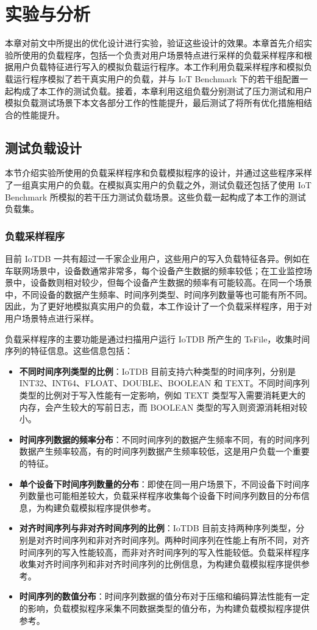 
\chapter{实验与分析\label{sec:chap8}}
本章对前文中所提出的优化设计进行实验，验证这些设计的效果。本章首先介绍实验所使用的负载程序，包括一个负责对用户场景特点进行采样的负载采样程序和根据用户负载特征进行写入的模拟负载运行程序。本工作利用负载采样程序和模拟负载运行程序模拟了若干真实用户的负载，并与 IoT Benchmark\cite{liu2019benchmarking} 下的若干组配置一起构成了本工作的测试负载。接着，本章利用这组负载分别测试了压力测试和用户模拟负载测试场景下本文各部分工作的性能提升，最后测试了将所有优化措施相结合的性能提升。
\section{测试负载设计}
本节介绍实验所使用的负载采样程序和负载模拟程序的设计，并通过这些程序采样了一组真实用户的负载。在模拟真实用户的负载之外，测试负载还包括了使用 IoT Benchmark 所模拟的若干压力测试负载场景。这些负载一起构成了本工作的测试负载集。
\subsection{负载采样程序}
目前 IoTDB 一共有超过一千家企业用户，这些用户的写入负载特征各异。例如在车联网场景中，设备数通常非常多，每个设备产生数据的频率较低；在工业监控场景中，设备数则相对较少，但每个设备产生数据的频率有可能较高。在同一个场景中，不同设备的数据产生频率、时间序列类型、时间序列数量等也可能有所不同。因此，为了更好地模拟真实用户的负载，本工作设计了一个负载采样程序，用于对用户场景特点进行采样。

负载采样程序的主要功能是通过扫描用户运行 IoTDB 所产生的 TsFile，收集时间序列的特征信息。这些信息包括：
\begin{itemize}
  \item \textbf{不同时间序列类型的比例}：IoTDB 目前支持六种类型的时间序列，分别是 INT32、INT64、FLOAT、DOUBLE、BOOLEAN 和 TEXT。不同时间序列类型的比例对于写入性能有一定影响，例如 TEXT 类型写入需要消耗更大的内存，会产生较大的写前日志，而 BOOLEAN 类型的写入则资源消耗相对较小。
  \item \textbf{时间序列数据的频率分布}：不同时间序列的数据产生频率不同，有的时间序列数据产生频率较高，有的时间序列数据产生频率较低，这是用户负载一个重要的特征。
  \item \textbf{单个设备下时间序列数量的分布}：即使在同一用户场景下，不同设备下时间序列数量也可能相差较大，负载采样程序收集每个设备下时间序列数目的分布信息，为构建负载模拟程序提供参考。
  \item \textbf{对齐时间序列与非对齐时间序列的比例}：IoTDB 目前支持两种序列类型，分别是对齐时间序列和非对齐时间序列。两种时间序列在性能上有所不同，对齐时间序列的写入性能较高，而非对齐时间序列的写入性能较低。负载采样程序收集对齐时间序列和非对齐时间序列的比例信息，为构建负载模拟程序提供参考。
  \item \textbf{时间序列的数值分布}：时间序列数据的值分布对于压缩和编码算法性能有一定的影响，负载模拟程序采集不同数据类型的值分布，为构建负载模拟程序提供参考。
\end{itemize}

